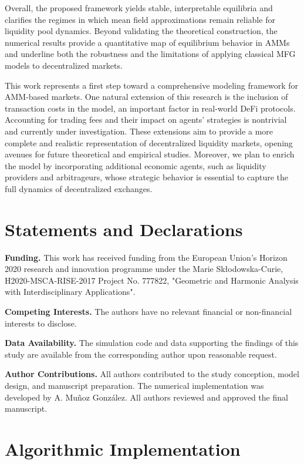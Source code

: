 \documentclass[11pt]{article}
\theoremstyle{definition}
\begin{document}
Overall, the proposed framework yields stable, interpretable equilibria and clarifies the regimes in which mean field approximations remain reliable for liquidity pool dynamics. Beyond validating the theoretical construction, the numerical results provide a quantitative map of equilibrium behavior in AMMs and underline both the robustness and the limitations of applying classical MFG models to decentralized markets. 

This work represents a first step toward a comprehensive modeling framework for AMM-based markets. One natural extension of this research is the inclusion of transaction costs in the model, an important factor in real-world DeFi protocols. Accounting for trading fees and their impact on agents' strategies is nontrivial and currently under investigation. These extensions aim to provide a more complete and realistic representation of decentralized liquidity markets, opening avenues for future theoretical and empirical studies. Moreover, we plan to enrich the model by incorporating additional economic agents, such as liquidity providers and arbitrageurs, whose strategic behavior is essential to capture the full dynamics of decentralized exchanges.


\section*{Statements and Declarations}

\textbf{Funding.} This work has received funding from the European Union’s Horizon 2020 research and innovation programme under the Marie Skłodowska-Curie, H2020-MSCA-RISE-2017 Project No. 777822,
"Geometric and Harmonic Analysis with Interdisciplinary Applications".

\textbf{Competing Interests.} The authors have no relevant financial or non-financial interests to disclose.

\textbf{Data Availability.} The simulation code and data supporting the findings of this study are available from the corresponding author upon reasonable request.

\textbf{Author Contributions.} All authors contributed to the study conception, model design, and manuscript preparation. The numerical implementation was developed by A. Mu\~noz Gonz\'alez. All authors reviewed and approved the final manuscript.

\appendix
\section{Algorithmic Implementation}
\label{sec:algorithm}
\end{document}
